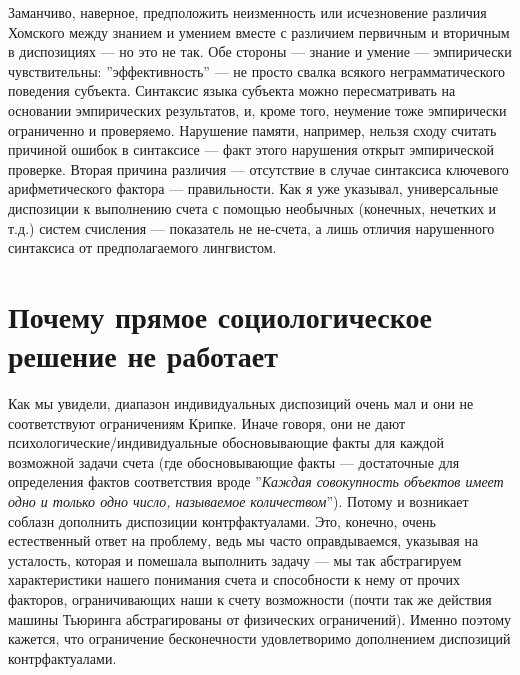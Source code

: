 \documentclass[11pt]{book}
\begin{document}
Заманчиво, наверное, предположить неизменность или исчезновение различия Хомского между знанием и умением вместе с различием первичным и вторичным в диспозициях --- но это не так. Обе стороны --- знание и умение --- эмпирически чувствительны: ''эффективность'' --- не просто свалка всякого неграмматического поведения субъекта. Синтаксис языка субъекта можно пересматривать на основании эмпирических результатов, и, кроме того, неумение тоже эмпирически ограниченно и проверяемо. Нарушение памяти, например, нельзя сходу считать причиной ошибок в синтаксисе --- факт этого нарушения открыт эмпирической проверке. Вторая причина различия --- отсутствие в случае синтаксиса ключевого арифметического фактора --- правильности. Как я уже указывал, универсальные диспозиции к выполнению счета с помощью необычных (конечных, нечетких и т.д.) систем счисления --- показатель не не-счета, а лишь отличия нарушенного синтаксиса от предполагаемого лингвистом.

\section{Почему прямое социологическое решение не работает}

Как мы увидели, диапазон индивидуальных диспозиций очень мал и они не соответствуют ограничениям Крипке. Иначе говоря, они не дают психологические/индивидуальные обосновывающие факты для каждой возможной задачи счета (где обосновывающие факты --- достаточные для определения фактов соответствия вроде ''\textit{Каждая совокупность объектов имеет одно и только одно число, называемое количеством}''). Потому и возникает соблазн дополнить диспозиции контрфактуалами. Это, конечно, очень естественный ответ на проблему, ведь мы часто оправдываемся, указывая на усталость, которая и помешала выполнить задачу --- мы так абстрагируем характеристики нашего понимания счета и способности к нему от прочих факторов, ограничивающих наши к счету возможности (почти так же действия машины Тьюринга абстрагированы от физических ограничений). Именно поэтому кажется, что ограничение бесконечности удовлетворимо дополнением диспозиций контрфактуалами.
\end{document}
